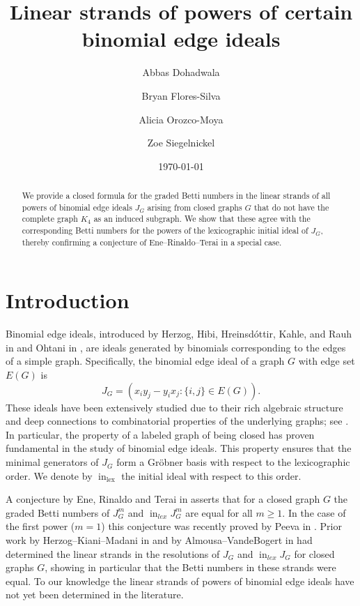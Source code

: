 \documentclass[reqno]{amsart}
\title{Linear strands of powers of certain binomial edge ideals}
\author[Dohadwala]{Abbas Dohadwala}
\author[Flores-Silva]{Bryan Flores-Silva}
\author[Orozco-Moya]{Alicia Orozco-Moya}
\author[Siegelnickel]{Zoe Siegelnickel}
\date{\today}
\theoremstyle{definition}
\theoremstyle{remark}
\numberwithin{equation}{section}
\DeclareMathOperator{\init}{in}
\DeclareMathOperator{\lex}{lex}
\begin{document}
\maketitle

\begin{abstract}
We provide a closed formula for the graded Betti numbers in the linear strands of all powers of  binomial edge ideals $J_G$ arising from closed graphs $G$ that do not have the complete graph $K_4$ as an induced subgraph. We show that these agree with the corresponding Betti numbers for the powers of the lexicographic initial ideal of $J_G$, thereby confirming a conjecture of Ene--Rinaldo--Terai in a special case.
\end{abstract}

\section{Introduction}

Binomial edge ideals, introduced by Herzog, Hibi, Hreinsd\'ottir, Kahle, and Rauh in \cite{herzog2010binomial} and Ohtani in \cite{Ohtani}, are ideals generated by binomials corresponding to the edges of a simple graph. Specifically, the binomial edge ideal of a graph $G$ with edge set $E(G)$ is 
\[J_{G}=\left (x_iy_j - y_ix_j : \{i,j\} \in E(G)\right).
\]
These ideals have been extensively studied due to their rich algebraic structure and deep connections to combinatorial properties of the underlying graphs; see \cite[Chapter 7]{HHO}. 
In particular, the property of a labeled graph of being closed has proven fundamental in the study of binomial edge ideals. This property ensures that the minimal generators of $J_{G}$ form a Gr\"obner basis with respect to the lexicographic order. 
We denote by $\init_{\lex}$ the initial ideal with respect to this order.


    A conjecture by Ene, Rinaldo and Terai in \cite[Conjecture 6.2]{ene2016powers} asserts that for a closed graph \({G}\) the graded Betti numbers of $J_{G}^m$ and $\operatorname{in}_{lex}{J_{G}^m}$ are equal for all $m\geq 1$. In the case of the first power ($m=1$) this conjecture was recently proved  by Peeva in \cite{Peeva}. Prior work by Herzog--Kiani--Madani in \cite{HKM} and by Almousa--VandeBogert in \cite{AV} had determined the linear strands in the resolutions of $J_{G}$ and
    $\operatorname{in}_{lex}{J_{G}}$ for closed graphs $G$, showing in particular that the Betti numbers in these strands were equal. To our knowledge the linear strands of powers of binomial edge ideals have not yet been determined in the literature.
    
\end{document}
